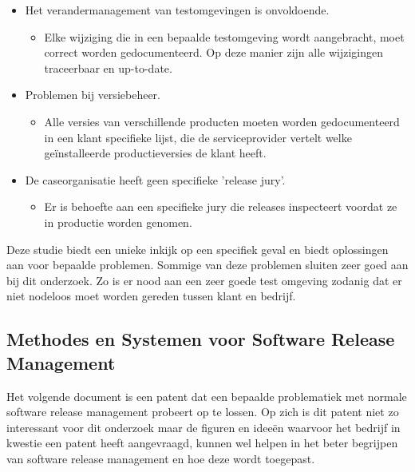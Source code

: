 \begin{itemize}
\begin{itemize}
    \end{itemize}
    \item Het verandermanagement van testomgevingen is onvoldoende.
    \begin{itemize}
        \item Elke wijziging die in een bepaalde testomgeving wordt aangebracht, moet correct worden gedocumenteerd. Op deze manier zijn alle wijzigingen traceerbaar en up-to-date.
    \end{itemize}
    \item Problemen bij versiebeheer.
    \begin{itemize}
        \item Alle versies van verschillende producten moeten worden gedocumenteerd in een klant specifieke lijst, die de serviceprovider vertelt welke geïnstalleerde productieversies de klant heeft.
    \end{itemize}
    \item De caseorganisatie heeft geen specifieke 'release jury'.
    \begin{itemize}
        \item Er is behoefte aan een specifieke jury die releases inspecteert voordat ze in productie worden genomen.
    \end{itemize}
\end{itemize}
Deze studie \autocite{Lahtela2011} biedt een unieke inkijk op een specifiek geval en biedt oplossingen aan voor bepaalde problemen. Sommige van deze problemen sluiten zeer goed aan bij dit onderzoek. Zo is er nood aan een zeer goede test omgeving zodanig dat er niet nodeloos moet worden gereden tussen klant en bedrijf.

\subsection{Methodes en Systemen voor Software Release Management}
Het volgende document \autocite{Barshefsky2005} is een patent dat een bepaalde problematiek met normale software release management probeert op te lossen. Op zich is dit patent niet zo interessant voor dit onderzoek maar de figuren en ideeën waarvoor het bedrijf in kwestie een patent heeft aangevraagd, kunnen wel helpen in het beter begrijpen van software release management en hoe deze wordt toegepast.

